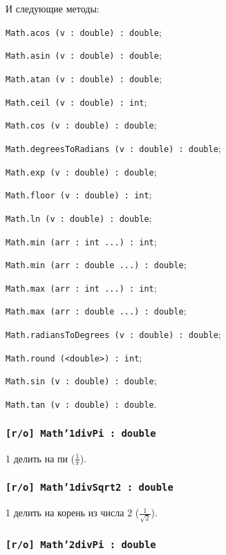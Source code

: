 И следующие методы:
\begin{icItems}
	\item \texttt{Math.acos (v : double) : double};
	\item \texttt{Math.asin (v : double) : double};
	\item \texttt{Math.atan (v : double) : double};
	\item \texttt{Math.ceil (v : double) : int};
	\item \texttt{Math.cos (v : double) : double};
	\item \texttt{Math.degreesToRadians (v : double) : double};
	\item \texttt{Math.exp (v : double) : double};
	\item \texttt{Math.floor (v : double) : int};
	\item \texttt{Math.ln (v : double) : double};
	\item \texttt{Math.min (arr : int ...) : int};
	\item \texttt{Math.min (arr : double ...) : double};
	\item \texttt{Math.max (arr : int ...) : int};
	\item \texttt{Math.max (arr : double ...) : double};
	\item \texttt{Math.radiansToDegrees (v : double) : double};
	\item \texttt{Math.round (<double>) : int};
	\item \texttt{Math.sin (v : double) : double};
	\item \texttt{Math.tan (v : double) : double}.
\end{icItems}

\subsubsection{\texttt{[r/o] Math'1divPi : double}}

1 делить на пи ($\frac{1}{\pi}$).

\subsubsection{\texttt{[r/o] Math'1divSqrt2 : double}}

1 делить на корень из числа 2 ($\frac{1}{\sqrt{2}}$).

\subsubsection{\texttt{[r/o] Math'2divPi : double}}

